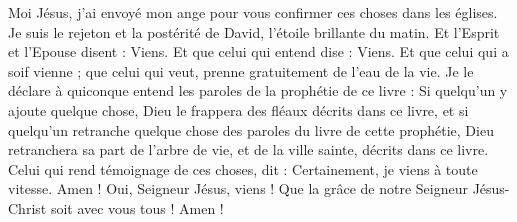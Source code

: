 \begin{multicols}{2}
Moi Jésus, j'ai envoyé mon ange pour vous confirmer ces choses dans les églises. Je suis le rejeton et la postérité de David, l'étoile brillante du matin.
Et l'Esprit et l'Epouse disent : Viens. Et que celui qui entend dise : Viens. Et que celui qui a soif vienne ; que celui qui veut, prenne gratuitement de l'eau de la vie.
Je le déclare à quiconque entend les paroles de la prophétie de ce livre : Si quelqu'un y ajoute quelque chose, Dieu le frappera des fléaux décrits dans ce livre,
et si quelqu'un retranche quelque chose des paroles du livre de cette prophétie, Dieu retranchera sa part de l'arbre de vie, et de la ville sainte, décrits dans ce livre.
Celui qui rend témoignage de ces choses, dit : Certainement, je viens à toute vitesse. Amen ! Oui, Seigneur Jésus, viens !
Que la grâce de notre Seigneur Jésus-Christ soit avec vous tous ! Amen !
\PPE{}
\end{multicols}
